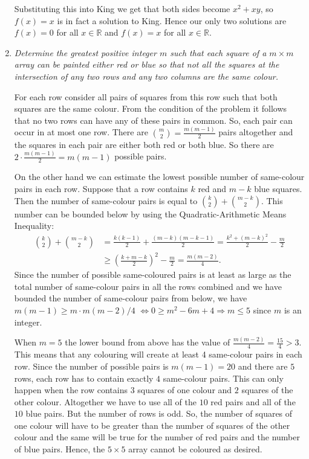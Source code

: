 \documentclass[a4paper,12pt]{article}
\begin{document}
\begin{enumerate}
	Substituting this into King we get that both sides become $x^2+xy$, so $f(x)=x$ is in fact a solution to King. Hence our only two solutions are $f(x)=0$ for all $x\in\mathbb{R}$ and $f(x)=x$ for all $x\in\mathbb{R}$.
	
	\item %
	\textit{Determine the greatest positive integer $m$ such that each square of a $m\times m$ array can be painted either red or blue so that not all the squares at the intersection of any two rows and any two columns are the same colour.}
	
	For each row consider all pairs of squares from this row such that both squares are the same colour. From the condition of the problem it follows that no two rows can have any of these pairs in common. So, each pair can occur in at most one row. There are $\binom{m}{2} = \frac{m(m-1)}{2}$ pairs altogether and the squares in each pair are either both red or both blue. So there are $2 \cdot \frac{m(m-1)}{2} = m(m - 1)$ possible pairs.
	
	On the other hand we can estimate the lowest possible number of same-colour pairs in each row. Suppose that a row contains $k$ red and $m-k$ blue squares. Then the number of same-colour pairs is equal to $\binom{k}{2} + \binom{m-k}{2}$. This number can be bounded below by using the Quadratic-Arithmetic Means Inequality:
	\begin{align*} \binom{k}{2}+\binom{m-k}{2} &= \frac{k(k-1)}{2} +\frac{(m-k)(m-k-1)}{2} = \frac{k^2+(m-k)^2}{2} -\frac{m}{2} \\ &\geq \left(\frac{k+m-k}{2}\right)^2 -\frac{m}{2} = \frac{m(m-2)}{4}. \end{align*}
	Since the number of possible same-coloured pairs is at least as large as the total number of same-colour pairs in all the rows combined and we have bounded the number of same-colour pairs from below, we have $m(m-1) \geq m\cdot m(m-2)/4$ $\iff 0 \geq m^2-6m+4 \Rightarrow m \leq 5$ since $m$ is an integer.
	
	When $m = 5$ the lower bound from above has the value of $\frac{m(m-2)}{4} = \frac{15}{4} > 3$. This means that any colouring will create at least 4 same-colour pairs in each row. Since the number of possible pairs is $m(m-1) = 20$ and there are $5$ rows, each row has to contain exactly $4$ same-colour pairs. This can only happen when the row contains $3$ squares of one colour and $2$ squares of the other colour. Altogether we have to use all of the $10$ red pairs and all of the $10$ blue pairs. But the number of rows is odd. So, the number of squares of one colour will have to be greater than the number of squares of the other colour and the same will be true for the number of red pairs and the number of blue pairs. Hence, the $5 \times 5$ array cannot be coloured as desired.
	

\end{enumerate}
\end{document}
